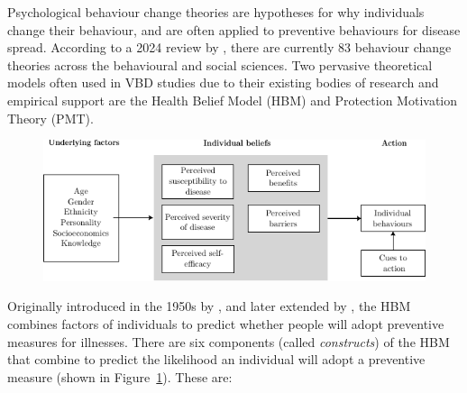 Psychological behaviour change theories are hypotheses for why individuals change their behaviour, and are often applied to preventive behaviours for disease spread. According to a 2024 review by \citet{vande_velde_integrated_2024}, there are currently 83 behaviour change theories across the behavioural and social sciences. Two pervasive theoretical models often used in VBD studies due to their existing bodies of research and empirical support are the Health Belief Model (HBM) and Protection Motivation Theory (PMT).

\begin{figure}[htb!]
     \centering
     \begin{adjustbox}{center}
          \includegraphics[width=1\textwidth]{figures/ch5/hbm-conceptual-diagram.pdf}
     \end{adjustbox}
    \label{fig:lit-review-hbm}
\end{figure}

Originally introduced in the 1950s by \citet{hochbaum_public_1958}, and later extended by \citet{becker_health_1974}, the HBM combines factors of individuals to predict whether people will adopt preventive measures for illnesses. There are six components (called \textit{constructs}) of the HBM that combine to predict the likelihood an individual will adopt a preventive measure (shown in Figure~\ref{fig:lit-review-hbm}). These are:

